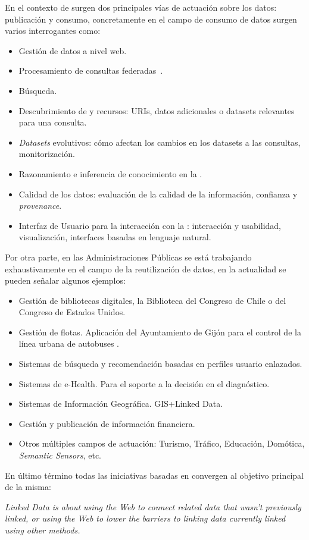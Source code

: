 En el contexto de \linkeddata surgen dos principales vías de actuación sobre los datos: publicación y consumo, concretamente en el campo de consumo de 
datos surgen varios interrogantes como:
\begin{itemize}
\item Gestión de datos a nivel web.
\item Procesamiento de consultas federadas~\cite{sparqlOpt}.
\item Búsqueda.
\item Descubrimiento de \datasets y recursos: URIs, datos adicionales o datasets relevantes para una consulta.
\item \textit{Datasets} evolutivos: cómo afectan los cambios en los datasets a las consultas, monitorización.
\item Razonamiento e inferencia de conocimiento en la \wod.
\item Calidad de los datos: evaluación de la calidad de la información, confianza y \textit{provenance}.
\item Interfaz de Usuario para la interacción con la \wod: interacción y usabilidad, visualización, interfaces basadas en lenguaje natural.
\end{itemize}


Por otra parte, en las Administraciones Públicas se está trabajando exhaustivamente en el campo de la reutilización de datos, en la actualidad 
se pueden señalar algunos ejemplos:
\begin{itemize}
\item Gestión de bibliotecas digitales, la Biblioteca del Congreso de Chile o del Congreso de Estados Unidos.
\item Gestión de flotas. Aplicación del Ayuntamiento de Gijón para el control de la línea urbana de autobuses .
\item Sistemas de búsqueda y recomendación basadas en perfiles usuario enlazados.
\item Sistemas de e-Health. Para el soporte a la decisión en el diagnóstico.
\item Sistemas de Información Geográfica. GIS+Linked Data.
\item Gestión y publicación de información financiera.
\item Otros múltiples campos de actuación: Turismo, Tráfico, Educación, Domótica, \textit{Semantic Sensors}, etc.
\end{itemize}

En último término todas las iniciativas basadas en \linkeddata convergen al objetivo principal de la misma:
\begin{Frame}
\textit{Linked Data is about using the Web to connect related data that wasn't previously linked, or using the Web to lower the barriers 
to linking data currently linked using other methods.} 
\end{Frame}


